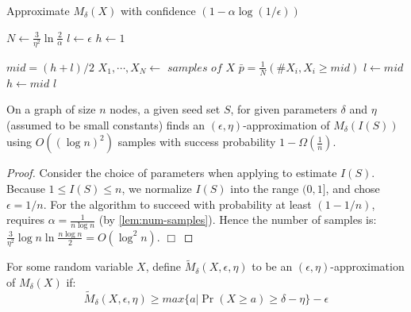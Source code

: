 \begin{algorithm}
  \caption{Approximate ${M_{\delta}(X)}$ with confidence
            $(1 - \alpha \log(1/\epsilon))$ }
  \label{alg:sampling}
  \begin{algorithmic}[1]
    \State $N \gets \frac{3}{\eta^2}\ln{\frac{2}{\alpha}}$
    \State $l \gets \epsilon$
    \State $h \gets 1$

      \State $\mathit{mid} = (h + l) / 2$
      \State $X_1,\cdots,X_N \gets \textit{ samples of } X $
      \State $\bar p = \frac{1}{N}(\# X_i, X_i \geq \mathit{mid})$
       $l \gets \mathit{mid}$
      \Else \enskip $h \gets \mathit{mid}$
      \EndIf
    \EndWhile
    \Return $l$
    \EndFunction
  \end{algorithmic}
\end{algorithm}
\begin{theorem}
\label{thr:numsmpls}
  On a graph of size $n$ nodes,  a given seed set $S$, for  given parameters
   $\delta$ and $\eta$ (assumed
  to be small constants)
   finds an $(\epsilon, \eta)$-approximation of $M_{\delta}(I(S))$ using $O((\log n)^2)$ samples with success probability
  $1- \Omega\left(\frac{1}{n}\right)$.
\end{theorem}
\begin{proof}
Consider the choice of parameters when applying  to estimate $I(S)$. Because $1 \leq
I(S) \leq n$, we normalize $I(S)$ into the range $(0,1]$, and chose $\epsilon = 1/n$.
For the algorithm to succeed with probability at least $(1 - 1/n)$,
requires $\alpha = \frac{1}{n \log n}$ (by \cref{lem:num-samples}).
 Hence the number of
samples is:$\frac{3}{\eta^2}\log{n}\ln{\frac{n\log n}{2}} = O(\log^2 n)$.
$\Box$
\end{proof}
\fi
%
For some random variable $X$, define $\widetilde{M}_{\delta}(X, \epsilon, \eta)$ to be
an $(\epsilon, \eta)$-approximation of $M_{\delta}(X)$ if:
\begin{equation}
\label{eq:numr-mdelta}
  \widetilde M_{\delta}(X, \epsilon, \eta) \geq max \{ a | \Pr(X \geq a) \geq \delta
    - \eta \} - \epsilon
\end{equation}
